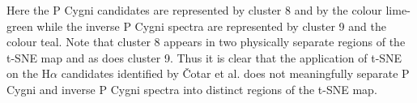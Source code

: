 Here the P Cygni candidates are represented by cluster 8 and by the colour lime-green while the inverse P Cygni spectra are represented by cluster 9 and the colour teal. Note that cluster 8 appears in two physically separate regions of the t-SNE map and as does cluster 9. Thus it is clear that the application of t-SNE on the H$\alpha$ candidates identified by Čotar et al. does not meaningfully separate P Cygni and inverse P Cygni spectra into distinct regions of the t-SNE map.